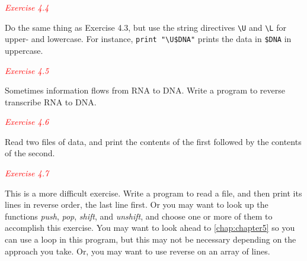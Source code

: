 \textcolor{red}{\textit{Exercise 4.4}}
\begin{adjustwidth}{1cm}{}
Do the same thing as Exercise 4.3, but use the string directives \verb|\U| and \verb|\L| for upper- and lowercase. For instance, \verb|print "\U$DNA"| prints the data in \verb|$DNA| in uppercase. 
\end{adjustwidth}

\textcolor{red}{\textit{Exercise 4.5}}
\begin{adjustwidth}{1cm}{}
Sometimes information flows from RNA to DNA. Write a program to reverse transcribe RNA to DNA. 
\end{adjustwidth}

\textcolor{red}{\textit{Exercise 4.6}}
\begin{adjustwidth}{1cm}{}
Read two files of data, and print the contents of the first followed by the contents of the second. 
\end{adjustwidth}

\textcolor{red}{\textit{Exercise 4.7}}
\begin{adjustwidth}{1cm}{}
This is a more difficult exercise. Write a program to read a file, and then print its lines in reverse order, the last line first. Or you may want to look up the functions \textit{push}, \textit{pop}, \textit{shift}, and \textit{unshift}, and choose one or more of them to accomplish this exercise. You may want to look ahead to \autoref{chap:chapter5} so you can use a loop in this program, but this may not be necessary depending on the approach you take. Or, you may want to use reverse on an array of lines. 
\end{adjustwidth}

